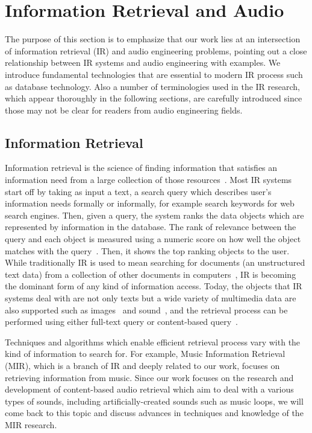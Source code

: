\section{Information Retrieval and Audio}
The purpose of this section is to emphasize that our work lies at an intersection of information retrieval (IR) and audio engineering problems, pointing out a close relationship between IR systems and audio engineering with examples. We introduce fundamental technologies that are essential to modern IR process such as database technology. Also a number of terminologies used in the IR research, which appear thoroughly in the following sections, are carefully introduced since those may not be clear for readers from audio engineering fields.

\subsection{Information Retrieval}

Information retrieval is the science of finding information that satisfies an information need from a large collection of those resources~\cite{manning2008}. Most IR systems start off by taking as input a text, a search query which describes user's information needs formally or informally, for example search keywords for web search engines. Then, given a query, the system ranks the data objects which are represented by information in the database. The rank of relevance between the query and each object is measured using a numeric score on how well the object matches with the query~\cite{guandong2010}. Then, it shows the top ranking objects to the user. While traditionally IR is used to mean searching for documents (an unstructured text data) from a collection of other documents in computers~\cite{manning2008}, IR is becoming the dominant form of any kind of information access. Today, the objects that IR systems deal with are not only texts but a wide variety of multimedia data are also supported such as images~\cite{abby2000} and sound~\cite{jonathan1999}, and the retrieval process can be performed using either full-text query or content-based query~\cite{lew2006}.

Techniques and algorithms which enable efficient retrieval process vary with the kind of information to search for. For example, Music Information Retrieval (MIR), which is a branch of IR and deeply related to our work, focuses on retrieving information from music. Since our work focuses on the research and development of content-based audio retrieval which aim to deal with a various types of sounds, including artificially-created sounds such as music loops, we will come back to this topic and discuss advances in techniques and knowledge of the MIR research. 

